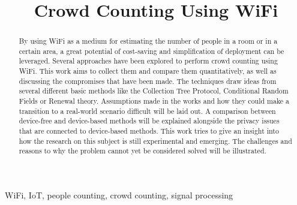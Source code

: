 \documentclass[conference]{IEEEtran}
\begin{document}
\title{Crowd Counting Using WiFi\\
}

\author{

}

\maketitle

\begin{abstract}
By using WiFi as a medium for estimating the number of people in a room or in a certain area, a great potential of cost-saving and simplification of deployment can be leveraged. Several approaches have been explored to perform crowd counting using WiFi. This work aims to collect them and compare them quantitatively, as well as discussing the compromises that have been made. The techniques draw ideas from several different basic methods like the Collection Tree Protocol, Conditional Random Fields or Renewal theory. Assumptions made in the works and how they could make a transition to a real-world scenario difficult will be laid out. A comparison between device-free and device-based methods will be explained alongside the privacy issues that are connected to device-based methods. This work tries to give an insight into how the research on this subject is still experimental and emerging. The challenges and reasons to why the problem cannot yet be considered solved will be illustrated.

\end{abstract}

\begin{IEEEkeywords}
WiFi, IoT, people counting, crowd counting, signal processing
\end{IEEEkeywords}

\end{document}
